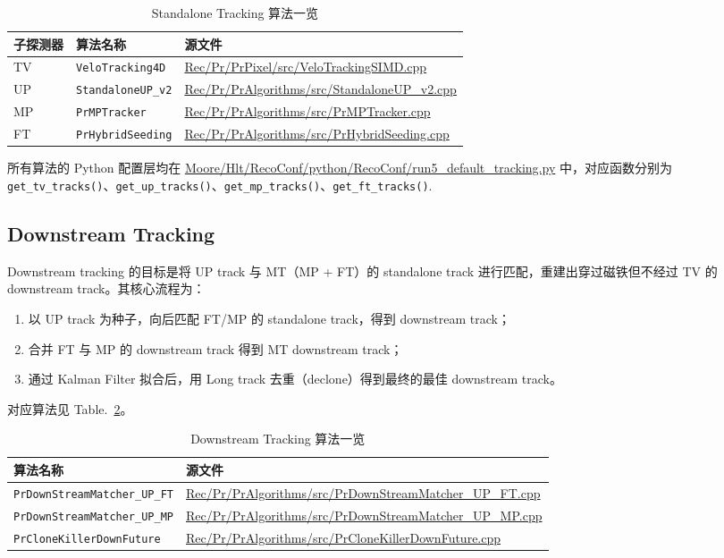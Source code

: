 \documentclass[UTF8]{article}
\begin{document}
\begin{table}[htbp]
  \centering
  \caption{Standalone Tracking 算法一览}
  \label{tab:standalone-algos}
  \begin{tabular}{lll}
    \toprule
    子探测器 & 算法名称 & 源文件 \\
    \midrule
    TV & \texttt{VeloTracking4D} & \url{Rec/Pr/PrPixel/src/VeloTrackingSIMD.cpp} \\
    UP & \texttt{StandaloneUP\_v2} & \url{Rec/Pr/PrAlgorithms/src/StandaloneUP_v2.cpp} \\
    MP & \texttt{PrMPTracker} & \url{Rec/Pr/PrAlgorithms/src/PrMPTracker.cpp} \\
    FT & \texttt{PrHybridSeeding} & \url{Rec/Pr/PrAlgorithms/src/PrHybridSeeding.cpp} \\
    \bottomrule
  \end{tabular}
\end{table}

所有算法的 Python 配置层均在 \url{Moore/Hlt/RecoConf/python/RecoConf/run5_default_tracking.py} 中，对应函数分别为 \lstinline{get_tv_tracks()}、\lstinline{get_up_tracks()}、\lstinline{get_mp_tracks()}、\lstinline{get_ft_tracks()}.




\subsection{Downstream Tracking}

Downstream tracking 的目标是将 UP track 与 MT（MP + FT）的 standalone track 进行匹配，重建出穿过磁铁但不经过 TV 的 downstream track。其核心流程为：
\begin{enumerate}
  \item 以 UP track 为种子，向后匹配 FT/MP 的 standalone track，得到 downstream track；
  \item 合并 FT 与 MP 的 downstream track 得到 MT downstream track；
  \item 通过 Kalman Filter 拟合后，用 Long track 去重（declone）得到最终的最佳 downstream track。
\end{enumerate}

对应算法见 Table.~\ref{tab:downstream-algos}。

\begin{table}[htbp]
  \centering
  \caption{Downstream Tracking 算法一览}
  \label{tab:downstream-algos}
  \begin{tabular}{ll}
    \toprule
    算法名称 & 源文件 \\
    \midrule
    \texttt{PrDownStreamMatcher\_UP\_FT} & \url{Rec/Pr/PrAlgorithms/src/PrDownStreamMatcher_UP_FT.cpp} \\
    \texttt{PrDownStreamMatcher\_UP\_MP} & \url{Rec/Pr/PrAlgorithms/src/PrDownStreamMatcher_UP_MP.cpp} \\
    \texttt{PrCloneKillerDownFuture} & \url{Rec/Pr/PrAlgorithms/src/PrCloneKillerDownFuture.cpp} \\
    \bottomrule
  \end{tabular}
\end{table}
\end{document}
